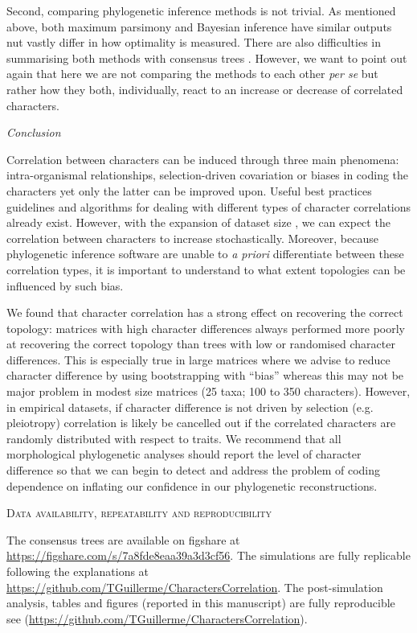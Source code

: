 \documentclass[12pt,letterpaper]{article}
\renewcommand{\section}[1]{%
\bigskip
\begin{center}
\begin{Large}
\normalfont\scshape #1
\medskip
\end{Large}
\end{center}}
\renewcommand{\subsection}[1]{%
\bigskip
\begin{center}
\begin{large}
\normalfont\itshape #1
\end{large}
\end{center}}
\begin{document}
Second, comparing phylogenetic inference methods is not trivial.
As mentioned above, both maximum parsimony and Bayesian inference have similar outputs nut vastly differ in how optimality is measured.
There are also difficulties in summarising both methods with consensus trees \cite{oReilly2017efficacy}.
However, we want to point out again that here we are not comparing the methods to each other \textit{per se} but rather how they both, individually, react to an increase or decrease of correlated characters.


\subsection{Conclusion}
Correlation between characters can be induced through three main phenomena: intra-organismal relationships, selection-driven covariation or biases in coding the characters yet only the latter can be improved upon.
Useful best practices guidelines \citep[e.g.][]{Brazeau2011,simoes2017giant} and algorithms for dealing with different types of character correlations \citep[e.g. ][]{de2015parsimony,BrazeauNA} already exist.
However, with the expansion of dataset size \citep[e.g.][> 1000 characters]{nithe2013,O'Leary08022013}, we can expect the correlation between characters to increase stochastically.
Moreover, because phylogenetic inference software are unable to \textit{a priori} differentiate between these correlation types, it is important to understand to what extent topologies can be influenced by such bias.

We found that character correlation has a strong effect on recovering the correct topology: matrices with high character differences always performed more poorly at recovering the correct topology than trees with low or randomised character differences.
This is especially true in large matrices where we advise to reduce character difference by using bootstrapping with ``bias'' whereas this may not be major problem in modest size matrices (25 taxa; 100 to 350 characters).
However, in empirical datasets, if character difference is not driven by selection (e.g. pleiotropy) correlation is likely be cancelled out if the correlated characters are randomly distributed with respect to traits.
We recommend that all morphological phylogenetic analyses should report the level of character difference so that we can begin to detect and address the problem of coding dependence on inflating our confidence in our phylogenetic reconstructions.

\section{Data availability, repeatability and reproducibility}
The consensus trees are available on figshare at \url{https://figshare.com/s/7a8fde8eaa39a3d3cf56}.
The simulations are fully replicable following the explanations at \url{https://github.com/TGuillerme/CharactersCorrelation}.
The post-simulation analysis, tables and figures (reported in this manuscript) are fully reproducible see (\url{https://github.com/TGuillerme/CharactersCorrelation}).
\end{document}
